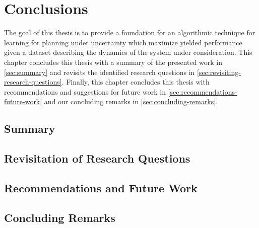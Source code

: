 \chapter{Conclusions}
\label{ch:conclusions}

The goal of this thesis is to provide a foundation for an algorithmic technique for learning  for planning under uncertainty which maximize yielded performance given a dataset describing the dynamics of the system under consideration.
This chapter concludes this thesis with a summary of the presented work in \autoref{sec:summary} and revisits the identified research questions in \autoref{sec:revisiting-research-questions}.
Finally, this chapter concludes this thesis with recommendations and suggestions for future work in \autoref{sec:recommendations-future-work} and our concluding remarks in \autoref{sec:concluding-remarks}.


\section{Summary}
\label{sec:summary}


\section{Revisitation of Research Questions}
\label{sec:revisiting-research-questions}


\section{Recommendations and Future Work}
\label{sec:recommendations-future-work}

% 

\section{Concluding Remarks}
\label{sec:concluding-remarks}

%